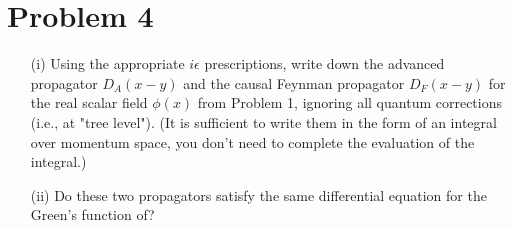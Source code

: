 \documentclass[12pt]{article}
\begin{document}
\section*{Problem 4}

\begin{enumerate}
    \item[(i)] Using the appropriate $i\epsilon$ prescriptions, write down the advanced propagator $D_{A}(x-y)$ and the causal Feynman propagator $D_{F}(x-y)$ for the real scalar field $\phi(x)$ from Problem 1, ignoring all quantum corrections (i.e., at "tree level"). (It is sufficient to write them in the form of an integral over momentum space, you don't need to complete the evaluation of the integral.)
    \item[(ii)] Do these two propagators satisfy the same differential equation for the Green's function of?
\end{enumerate}

\vspace{1em}
\end{document}
